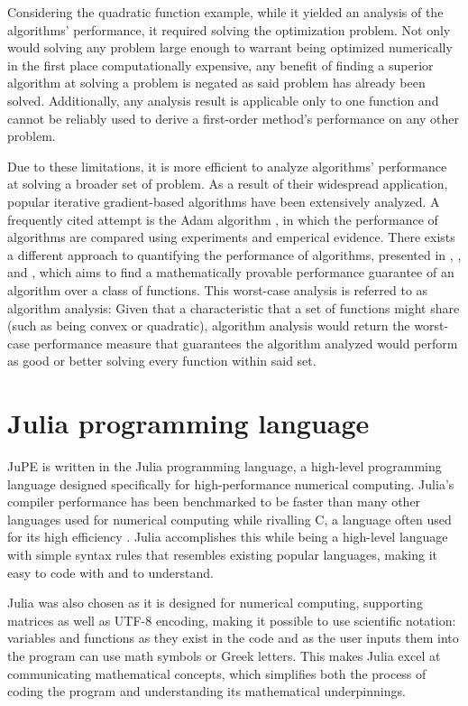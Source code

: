 Considering the quadratic function example, while it yielded an analysis of the algorithms' performance, it required solving the optimization problem. Not only would solving any problem large enough to warrant being optimized numerically in the first place computationally expensive, any benefit of finding a superior algorithm at solving a problem is negated as said problem has already been solved. Additionally, any analysis result is applicable only to one function and cannot be reliably used to derive a first-order method's performance on any other problem.

Due to these limitations, it is more efficient to analyze algorithms' performance at solving a broader set of problem. As a result of their widespread application, popular iterative gradient-based algorithms have been extensively analyzed. A frequently cited attempt is the Adam algorithm \cite{adam}, in which the performance of algorithms are compared using experiments and emperical evidence. There exists a different approach to quantifying the performance of algorithms, presented in \cite{drori2012}, \cite{taylor2016}, and \cite{lessard2016}, which aims to find a mathematically provable performance guarantee of an algorithm over a class of functions. This worst-case analysis is referred to as algorithm analysis: Given that a characteristic that a set of functions might share (such as being convex or quadratic), algorithm analysis would return the worst-case performance measure that guarantees the algorithm analyzed would perform as good or better solving every function within said set.

\section{Julia programming language}

JuPE is written in the Julia programming language, a high-level programming language designed specifically for high-performance numerical computing. Julia's compiler performance has been benchmarked to be faster than many other languages used for numerical computing while rivalling C, a language often used for its high efficiency \cite{julia}. Julia accomplishes this while being a high-level language with simple syntax rules that resembles existing popular languages, making it easy to code with and to understand.

Julia was also chosen as it is designed for numerical computing, supporting matrices as well as UTF-8 encoding, making it possible to use scientific notation: variables and functions as they exist in the code and as the user inputs them into the program can use math symbols or Greek letters. This makes Julia excel at communicating mathematical concepts, which simplifies both the process of coding the program and understanding its mathematical underpinnings.

